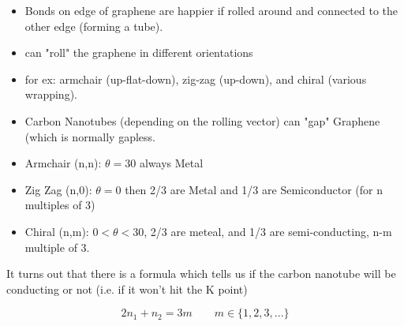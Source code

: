  \begin{itemize}
     \item Bonds on edge of graphene are happier if rolled around and connected to the other edge (forming a tube).
     \item can "roll" the graphene in different orientations
     \item for ex: armchair (up-flat-down), zig-zag (up-down), and chiral (various wrapping).
     \item Carbon Nanotubes (depending on the rolling vector) can "gap" Graphene (which is normally gapless.
     \item Armchair (n,n): $\theta=30$ always Metal
     \item Zig Zag (n,0): $\theta = 0$ then 2/3 are Metal and 1/3 are Semiconductor (for n multiples of 3)
     \item Chiral (n,m): $0<\theta<30$, 2/3 are meteal, and 1/3 are semi-conducting, n-m multiple of 3.
 \end{itemize}
 
 It turns out that there is a formula which tells us if the carbon nanotube will be conducting or not (i.e. if it won't hit the K point)
 
 \begin{equation}
     2n_1+n_2 = 3m \qquad m\in \{1,2,3, ...\}
 \end{equation}
